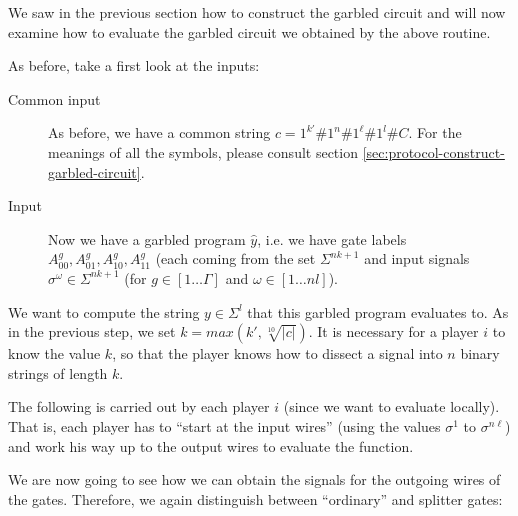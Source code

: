 We saw in the previous section how to construct the garbled circuit and will now examine how to evaluate the garbled circuit we obtained by the above routine.

As before, take a first look at the inputs:

\begin{description}
\item[Common input] As before, we have a common string $c=1^{k'}\#1^n\#1^\ell\#1^l
\#C$. For the meanings of all the symbols, please consult section \ref{sec:protocol-construct-garbled-circuit}.
\item[Input] Now we have a garbled program $\hat y$, i.e. we have gate labels $A^g_{00}, A^g_{01}, A^g_{10}, A^g_{11}$ (each coming from the set $\Sigma^{nk+1}$ and input signals $\sigma^\omega\in\Sigma^{nk+1}$ (for $g\in[1\dots\Gamma]$ and $\omega\in[1\dots nl]$).
\end{description}

We want to compute the string $y\in\Sigma^l$ that this garbled program evaluates to. As in the previous step, we set $k=max(k',\sqrt[10]{|c|})$. It is necessary for a player $i$ to know the value $k$, so that the player knows how to dissect a signal into $n$ binary strings of length $k$.

The following is carried out by each player $i$ (since we want to evaluate locally). That is, each player has to ``start at the input wires'' (using the values $\sigma^1$ to $\sigma^{n\ell}$) and work his way up to the output wires to evaluate the function.

We are now going to see how we can obtain the signals for the outgoing wires of the gates. Therefore, we again distinguish between ``ordinary'' and splitter gates:

